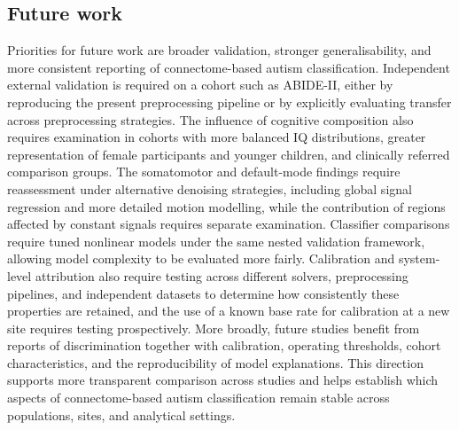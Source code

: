 \subsection{Future work}
\label{subsec:future-work}

Priorities for future work are broader validation, stronger generalisability, and more consistent reporting of connectome-based autism classification. Independent external validation is required on a cohort such as ABIDE-II, either by reproducing the present preprocessing pipeline or by explicitly evaluating transfer across preprocessing strategies. The influence of cognitive composition also requires examination in cohorts with more balanced IQ distributions, greater representation of female participants and younger children, and clinically referred comparison groups. The somatomotor and default-mode findings require reassessment under alternative denoising strategies, including global signal regression and more detailed motion modelling, while the contribution of regions affected by constant signals requires separate examination. Classifier comparisons require tuned nonlinear models under the same nested validation framework, allowing model complexity to be evaluated more fairly. Calibration and system-level attribution also require testing across different solvers, preprocessing pipelines, and independent datasets to determine how consistently these properties are retained, and the use of a known base rate for calibration at a new site requires testing prospectively. More broadly, future studies benefit from reports of discrimination together with calibration, operating thresholds, cohort characteristics, and the reproducibility of model explanations. This direction supports more transparent comparison across studies and helps establish which aspects of connectome-based autism classification remain stable across populations, sites, and analytical settings.
